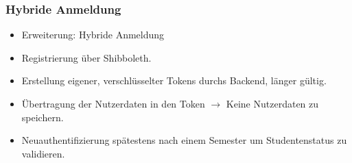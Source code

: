\begin{frame}\frametitle{Hybride Anmeldung}
    \begin{itemize}
        \item Erweiterung: Hybride Anmeldung
        \item Registrierung über Shibboleth.
        \item Erstellung eigener, verschlüsselter Tokens durchs Backend, länger gültig.
        \item Übertragung der Nutzerdaten in den Token $\rightarrow$ Keine Nutzerdaten zu speichern.
        \item Neuauthentifizierung spätestens nach einem Semester um Studentenstatus zu validieren.
    \end{itemize}
\end{frame}